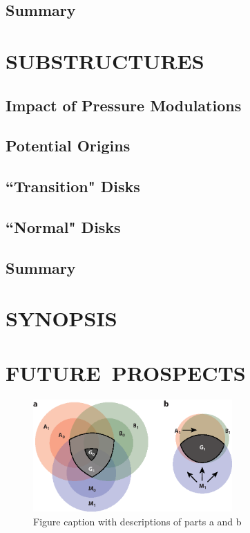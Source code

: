 \documentclass[a4paper]{ar-1col}
\begin{document}


\subsection{Summary}



\section{SUBSTRUCTURES} \label{sec:substructures}

\subsection{Impact of Pressure Modulations}

\subsection{Potential Origins}

\subsection{``Transition" Disks}

\subsection{``Normal" Disks}

\subsection{Summary}


\section{SYNOPSIS} \label{sec:summary}



\section{FUTURE\ PROSPECTS} \label{sec:future}


\begin{figure}[h]
\includegraphics[width=3in]{SampleFigure}
\caption{Figure caption with descriptions of parts a and b}
\label{fig1}
\end{figure}
\end{document}
